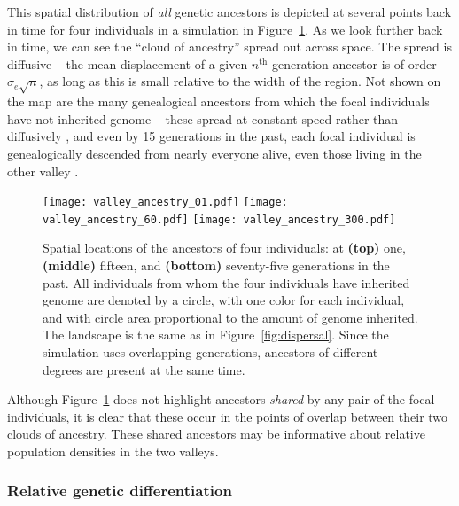 \documentclass{ar-1col}
\renewcommand{\emph}[1]{{\textit{#1}}}
\begin{document}
{This spatial distribution of \emph{all} genetic ancestors is depicted 
at several points back in time
for four individuals in a simulation in Figure~\ref{ancestry_spread}.
As we look further back in time,
we can see the ``cloud of ancestry'' spread out across space.
The spread is diffusive --
the mean displacement of a given $n^\text{th}$-generation ancestor 
is of order $\sigma_e \sqrt{n}$,
as long as this is small relative to the width of the region.
Not shown on the map are the many genealogical ancestors
from which the focal individuals have not inherited genome --
these spread at constant speed rather than diffusively \citep{kelleher2016spread},
and even by 15 generations in the past,
each focal individual is genealogically descended from nearly everyone alive,
even those living in the other valley \citep{chang1999}.

\begin{figure}	%
        \texttt{[image: valley\_ancestry\_01.pdf]}
        \texttt{[image: valley\_ancestry\_60.pdf]}
        \texttt{[image: valley\_ancestry\_300.pdf]}
        \caption{
            Spatial locations of the ancestors of four individuals:
            at 
            \textbf{(top)} one, 
            \textbf{(middle)} fifteen, and
            \textbf{(bottom)} seventy-five generations in the past.
            All individuals from whom the four individuals have inherited genome are denoted by a circle,
            with one color for each individual,
            and with circle area proportional to the amount of genome inherited.
            The landscape is the same as in Figure~\ref{fig:dispersal}.
            Since the simulation uses overlapping generations,
            ancestors of different degrees are present at the same time.
        }
        \label{ancestry_spread}
\end{figure}

Although Figure~\ref{ancestry_spread} does not highlight 
ancestors \emph{shared} by any pair of the focal individuals,
it is clear that these occur in the points of overlap between their two clouds of ancestry.
These shared ancestors may be informative about relative population densities in the two valleys.


\subsubsection{Relative genetic differentiation}

}
\end{document}
